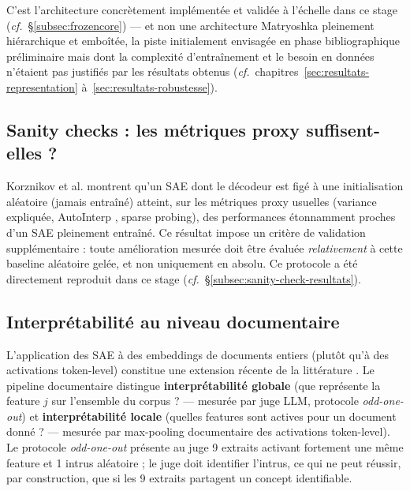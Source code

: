 \documentclass[11pt]{article}
\begin{document}
C'est l'architecture concrètement implémentée et
validée à l'échelle dans ce stage (\emph{cf.}~\S\ref{subsec:frozencore}) ---
et non une architecture Matryoshka pleinement hiérarchique et emboîtée, la
piste initialement envisagée en phase bibliographique préliminaire mais dont
la complexité d'entraînement et le besoin en données n'étaient pas justifiés
par les résultats obtenus (\emph{cf.}~chapitres~\ref{sec:resultats-representation}
à~\ref{sec:resultats-robustesse}).

\subsection{Sanity checks : les métriques proxy suffisent-elles ?}

Korznikov et al. \cite{korznikov2025sanitychecks} montrent qu'un SAE dont le
décodeur est figé à une initialisation aléatoire (jamais entraîné) atteint,
sur les métriques proxy usuelles (variance expliquée, AutoInterp
\cite{bills2023language}, sparse probing), des performances étonnamment
proches d'un SAE pleinement entraîné.
Ce résultat impose un critère de validation supplémentaire : toute
amélioration mesurée doit être évaluée \emph{relativement} à cette baseline
aléatoire gelée, et non uniquement en absolu. Ce protocole a été directement
reproduit dans ce stage (\emph{cf.}~\S\ref{subsec:sanity-check-resultats}).

\subsection{Interprétabilité au niveau documentaire}

L'application des SAE à des embeddings de documents entiers (plutôt qu'à des
activations token-level) constitue une extension récente de la littérature
\cite{jiang2024sae_embeddings, decodedense2025}. Le pipeline documentaire
distingue \textbf{interprétabilité globale} (que représente la feature $j$ sur
l'ensemble du corpus ? --- mesurée par juge LLM, protocole \emph{odd-one-out})
et \textbf{interprétabilité locale} (quelles features sont actives pour un
document donné ? --- mesurée par max-pooling documentaire des activations
token-level). Le protocole \emph{odd-one-out}
\cite{templeton2024scaling, karvonen2025saebench} présente au juge 9 extraits activant fortement une
même feature et 1 intrus aléatoire ; le juge doit identifier l'intrus, ce qui
ne peut réussir, par construction, que si les 9 extraits partagent un concept
identifiable.

\newpage
\end{document}
